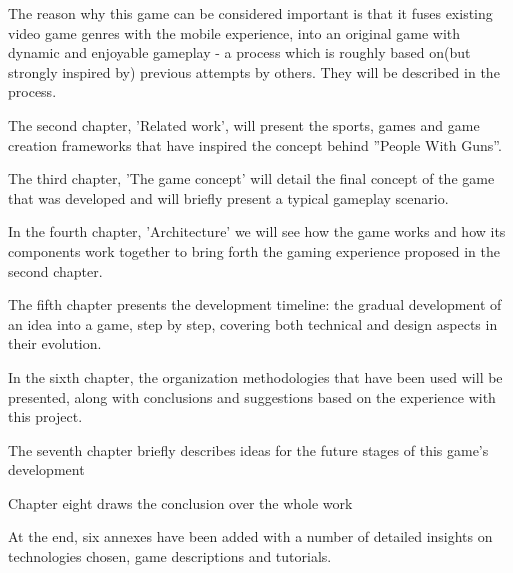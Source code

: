 The reason why this game can be considered important is that it fuses existing
video game genres with the mobile experience, into an original game with dynamic
and enjoyable gameplay - a process which is roughly based on(but strongly
inspired by) previous attempts by others. They will be described in the
process.\newline

The second chapter, 'Related work', will present the sports, games and game
creation frameworks that have inspired the concept behind ''People With Guns''.
\newline

The third chapter, 'The game concept' will detail the final concept of the game
that was developed and will briefly present a typical gameplay scenario.\newline

In the fourth chapter, 'Architecture' we will see how the game works and how its
components work together to bring forth the gaming experience proposed in the
second chapter.\newline

The fifth chapter presents the development timeline: the gradual development of
an idea into a game, step by step, covering both technical and design aspects in
their evolution.\newline

In the sixth chapter, the organization methodologies that have been used will be
presented, along with conclusions and suggestions based on the experience with
this project.\newline

The seventh chapter briefly describes ideas for the future stages of this game's
development\newline

Chapter eight draws the conclusion over the whole work\newline

At the end, six annexes have been added with a number of detailed insights on
technologies chosen, game descriptions and tutorials.
